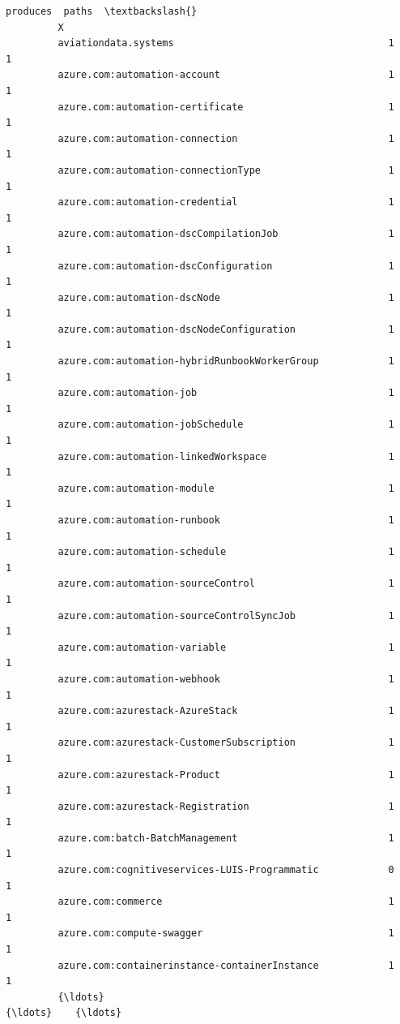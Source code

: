 \documentclass[11pt]{article}
\begin{document}
\begin{Verbatim}[commandchars=\\\{\}]
                                                           produces  paths  \textbackslash{}
         X                                                                   
         aviationdata.systems                                     1      1   
         azure.com:automation-account                             1      1   
         azure.com:automation-certificate                         1      1   
         azure.com:automation-connection                          1      1   
         azure.com:automation-connectionType                      1      1   
         azure.com:automation-credential                          1      1   
         azure.com:automation-dscCompilationJob                   1      1   
         azure.com:automation-dscConfiguration                    1      1   
         azure.com:automation-dscNode                             1      1   
         azure.com:automation-dscNodeConfiguration                1      1   
         azure.com:automation-hybridRunbookWorkerGroup            1      1   
         azure.com:automation-job                                 1      1   
         azure.com:automation-jobSchedule                         1      1   
         azure.com:automation-linkedWorkspace                     1      1   
         azure.com:automation-module                              1      1   
         azure.com:automation-runbook                             1      1   
         azure.com:automation-schedule                            1      1   
         azure.com:automation-sourceControl                       1      1   
         azure.com:automation-sourceControlSyncJob                1      1   
         azure.com:automation-variable                            1      1   
         azure.com:automation-webhook                             1      1   
         azure.com:azurestack-AzureStack                          1      1   
         azure.com:azurestack-CustomerSubscription                1      1   
         azure.com:azurestack-Product                             1      1   
         azure.com:azurestack-Registration                        1      1   
         azure.com:batch-BatchManagement                          1      1   
         azure.com:cognitiveservices-LUIS-Programmatic            0      1   
         azure.com:commerce                                       1      1   
         azure.com:compute-swagger                                1      1   
         azure.com:containerinstance-containerInstance            1      1   
         {\ldots}                                                    {\ldots}    {\ldots}   

\end{Verbatim}
\end{document}

